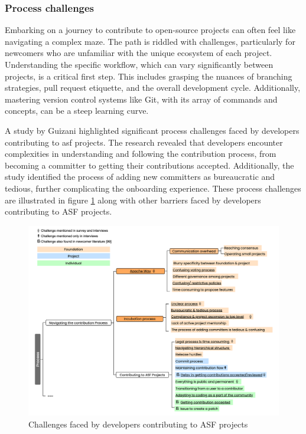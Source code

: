 \subsubsection{Process challenges}

Embarking on a journey to contribute to open-source projects can often feel like navigating a complex maze. The path is riddled with challenges, particularly for newcomers who are unfamiliar with the unique ecosystem of each project. Understanding the specific workflow, which can vary significantly between projects, is a critical first step. This includes grasping the nuances of branching strategies, pull request etiquette, and the overall development cycle. Additionally, mastering version control systems like Git, with its array of commands and concepts, can be a steep learning curve.

A study by Guizani \cite{04guizani2021long} highlighted significant process challenges faced by developers contributing to \ac{asf} projects. The research revealed that developers encounter complexities in understanding and following the contribution process, from becoming a committer to getting their contributions accepted. Additionally, the study identified the process of adding new committers as bureaucratic and tedious, further complicating the onboarding experience. These process challenges are illustrated in figure \ref{fig:processChallenges} along with other barriers faced by developers contributing to ASF projects.

\begin{figure}[ht]
    \centering
    \includegraphics[width=1\linewidth]{figs/processChallenges.png}
    \caption{Challenges faced by developers contributing to ASF projects \cite{04guizani2021long}}
    \label{fig:processChallenges}
\end{figure}


